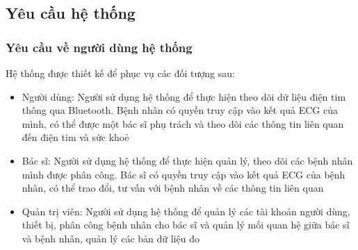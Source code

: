 \subsection{Yêu cầu hệ thống}
\subsubsection{Yêu cầu về người dùng hệ thống}
Hệ thống được thiết kế để phục vụ các đối tượng sau:
\begin{adjustwidth}{1.5em}{}
\begin{itemize}
    \item Người dùng: Người sử dụng hệ thống để thực hiện theo dõi dữ liệu điện tim thông qua Bluetooth. Bệnh nhân có quyền truy cập vào kết quả ECG của mình, có thể được một bác sĩ phụ trách và theo dõi các thông tin liên quan đến điện tim và sức khoẻ
    \item Bác sĩ: Người sử dụng hệ thống để thực hiện quản lý, theo dõi các bệnh nhân mình được phân công. Bác sĩ có quyền truy cập vào kết quả ECG của bệnh nhân, có thể trao đổi, tư vấn với bệnh nhân về các thông tin liên quan
    \item Quản trị viên: Người sử dụng hệ thống để quản lý các tài khoản người dùng, thiết bị, phân công bệnh nhân cho bác sĩ và quản lý mối quan hệ giữa bác sĩ và bệnh nhân, quản lý các bản dữ liệu đo
\end{itemize}
\end{adjustwidth}

